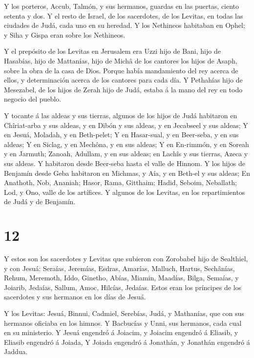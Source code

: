  Y los porteros, Accub, Talmón, y sus hermanos, guardas en
las puertas, ciento setenta y dos.  Y el resto de Israel,
de los sacerdotes, de los Levitas, en todas las ciudades de Judá, cada
uno en su heredad.  Y los Nethineos habitaban en Ophel; y
Siha y Gispa eran sobre los Nethineos.

 Y el prepósito de los Levitas en Jerusalem era Uzzi hijo
de Bani, hijo de Hasabías, hijo de Mattanías, hijo de Michâ de los
cantores los hijos de Asaph, sobre la obra de la casa de Dios.
 Porque había mandamiento del rey acerca de ellos, y
determinación acerca de los cantores para cada día.  Y
Pethahías hijo de Mesezabel, de los hijos de Zerah hijo de Judá, estaba
á la mano del rey en todo negocio del pueblo.

 Y tocante á las aldeas y sus tierras, algunos de los hijos
de Judá habitaron en Chîriat-arba y sus aldeas, y en Dibón y sus aldeas,
y en Jecabseel y sus aldeas;  Y en Jesuá, Moladah, y en
Beth-pelet;  Y en Hasar-sual, y en Beer-seba, y en sus
aldeas;  Y en Siclag, y en Mechôna, y en sus aldeas;
 Y en En-rimmón, y en Soreah y en Jarmuth; 
Zanoah, Adullam, y en sus aldeas; en Lachîs y sus tierras, Azeca y sus
aldeas. Y habitaron desde Beer-seba hasta el valle de Hinnom.
 Y los hijos de Benjamín desde Geba habitaron en Michmas, y
Aía, y en Beth-el y sus aldeas;  En Anathoth, Nob, Ananiah;
 Hasor, Rama, Gitthaim;  Hadid, Seboim,
Neballath;  Lod, y Ono, valle de los artífices.
 Y algunos de los Levitas, en los repartimientos de Judá y
de Benjamín.

\hypertarget{section-11}{%
\section{12}\label{section-11}}

 Y estos son los sacerdotes y Levitas que subieron con
Zorobabel hijo de Sealthiel, y con Jesuá: Seraías, Jeremías, Esdras,
 Amarías, Malluch, Hartus,  Sechânías, Rehum,
Meremoth,  Iddo, Ginetho, Abías,  Miamin,
Maadías, Bilga,  Semaías, y Joiarib, Jedaías, 
Sallum, Amoc, Hilcías, Jedaías. Estos eran los príncipes de los
sacerdotes y sus hermanos en los días de Jesuá.

 Y los Levitas: Jesuá, Binnui, Cadmiel, Serebías, Judá, y
Mathanías, que con sus hermanos oficiaba en los himnos.  Y
Bacbucías y Unni, sus hermanos, cada cual en su ministerio.
 Y Jesuá engendró á Joiacim, y Joiacim engendró á Eliasib,
y Eliasib engendró á Joiada,  Y Joiada engendró á Jonathán,
y Jonathán engendró á Jaddua.

